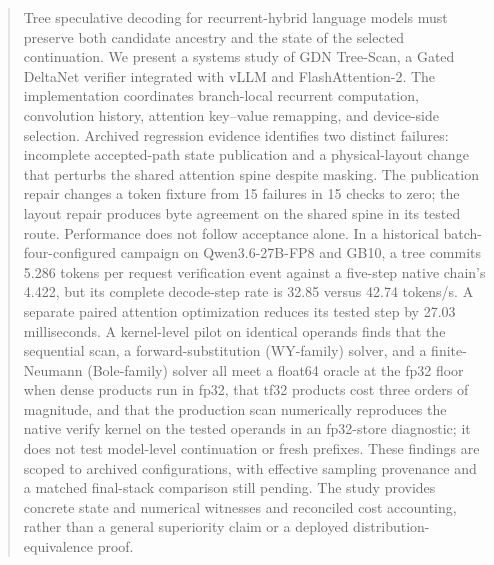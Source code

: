 \begin{abstract}
Tree speculative decoding for recurrent-hybrid language models must preserve both candidate ancestry and the state of the selected continuation. We present a systems study of GDN Tree-Scan, a Gated DeltaNet verifier integrated with vLLM and FlashAttention-2. The implementation coordinates branch-local recurrent computation, convolution history, attention key--value remapping, and device-side selection. Archived regression evidence identifies two distinct failures: incomplete accepted-path state publication and a physical-layout change that perturbs the shared attention spine despite masking. The publication repair changes a token fixture from 15 failures in 15 checks to zero; the layout repair produces byte agreement on the shared spine in its tested route. Performance does not follow acceptance alone. In a historical batch-four-configured campaign on Qwen3.6-27B-FP8 and GB10, a tree commits 5.286 tokens per request verification event against a five-step native chain's 4.422, but its complete decode-step rate is 32.85 versus 42.74 tokens/s. A separate paired attention optimization reduces its tested step by 27.03 milliseconds. A kernel-level pilot on identical operands finds that the sequential scan, a forward-substitution (WY-family) solver, and a finite-Neumann (Bole-family) solver all meet a float64 oracle at the fp32 floor when dense products run in fp32, that tf32 products cost three orders of magnitude, and that the production scan numerically reproduces the native verify kernel on the tested operands in an fp32-store diagnostic; it does not test model-level continuation or fresh prefixes. These findings are scoped to archived configurations, with effective sampling provenance and a matched final-stack comparison still pending. The study provides concrete state and numerical witnesses and reconciled cost accounting, rather than a general superiority claim or a deployed distribution-equivalence proof.
\end{abstract}

